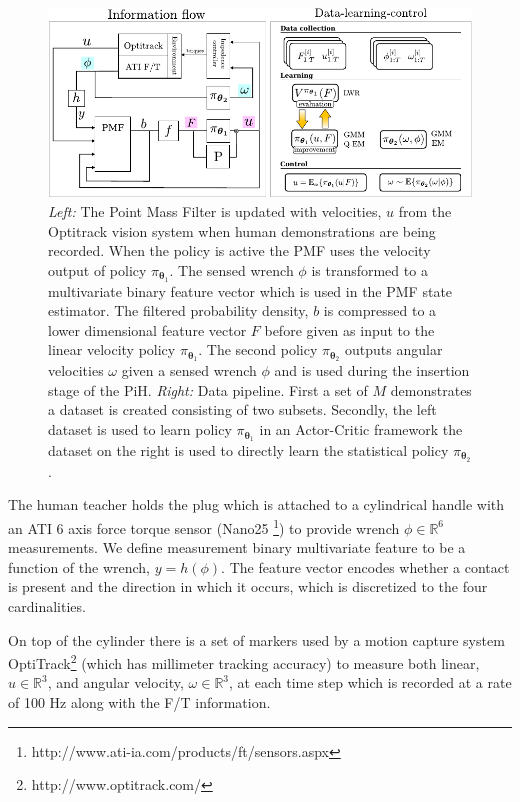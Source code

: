 \documentclass[final,5p,times,twocolumn]{elsarticle}
\newcommand{\Param}{\boldsymbol{\theta}}
\begin{document}
\begin{figure}\label{fig:data-flow}
\centering
\includegraphics[width=0.9\linewidth]{./Figure/parameters-system-only-two-v2.pdf}
 \caption{\textit{Left:} The Point Mass Filter is updated with velocities, $u$ from the 
 Optitrack vision system when human demonstrations are being recorded. When the policy is active the PMF uses 
 the velocity output of policy $\pi_{\Param_1}$. The sensed wrench $\phi$ is transformed to a multivariate binary 
 feature vector which is used in the PMF state estimator. The filtered probability density, $b$ is compressed to a lower 
 dimensional feature vector $F$ before given as input to the linear velocity policy $\pi_{\Param_1}$. The second policy 
 $\pi_{\Param_2}$ outputs angular velocities $\omega$ given a sensed wrench $\phi$ and is used during the insertion stage of the PiH. 
 \textit{Right:} Data pipeline. First a set of $M$ demonstrates a dataset is created consisting of two subsets. Secondly, the left 
 dataset is used to learn policy $\pi_{\Param_1}$ in an Actor-Critic framework the dataset on the right is used 
 to directly learn the statistical policy $\pi_{\Param_2}$.}
\end{figure}


The human teacher holds the plug which is attached to a cylindrical handle with 
an ATI 6 axis force torque sensor (Nano25 \footnote{http://www.ati-ia.com/products/ft/sensors.aspx}) 
to provide wrench $\phi \in \mathbb{R}^6$ measurements. We define measurement binary multivariate
feature to be a function of the wrench, $y = h(\phi)$. The feature vector encodes whether a contact is present 
and the direction in which it occurs, which is discretized to the four cardinalities.

On top of the cylinder there is a set of markers used by a motion capture system 
OptiTrack\footnote{http://www.optitrack.com/} (which has millimeter tracking accuracy) to measure 
both linear, $u \in \mathbb{R}^3$, and angular velocity, $\omega \in \mathbb{R}^3$, at each 
time step which is recorded at a rate of 100 Hz along with the F/T information. 
\end{document}
